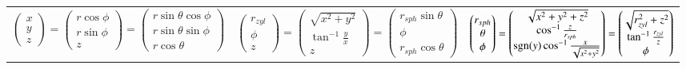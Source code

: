 {\begin{tabular}{c c c}
        $ 
        \begin{pmatrix}
            x \\ y \\ z
        \end{pmatrix} 
        =
        \begin{pmatrix}
            r \cos \phi \\ r \sin \phi \\ z
        \end{pmatrix}
        =
        \begin{pmatrix}
            r \sin \theta \cos \phi \\ r \sin \theta \sin \phi \\ r \cos \theta
        \end{pmatrix}
        $ &
        $ 
        \begin{pmatrix}
            r_{zyl} \\ \phi \\ z
        \end{pmatrix} 
        =
        \begin{pmatrix}
            \sqrt{x^2 + y^2} \\ \tan^{-1}\frac{y}{x} \\ z
        \end{pmatrix}
        =
        \begin{pmatrix}
            r_{sph} \sin \theta \\ \phi \\ r_{sph} \cos \theta
        \end{pmatrix}
        $ &
        $ 
        \begin{pmatrix}
            r_{sph} \\ \theta \\ \phi
        \end{pmatrix} 
        =
        \begin{pmatrix}
            \sqrt{x^2+y^2+z^2} \\ \cos^{-1} \frac{z}{r_{sph}} \\ \operatorname{sgn}(y) \cos^{-1} \frac{x}{\sqrt{x^2+y^2}}
        \end{pmatrix}
        =
        \begin{pmatrix}
            \sqrt{r_{zyl}^2+z^2} \\ \tan^{-1}\frac{r_{zyl}}{z} \\ \phi
        \end{pmatrix}
        $ \\
    \end{tabular}
}
\smallskip
